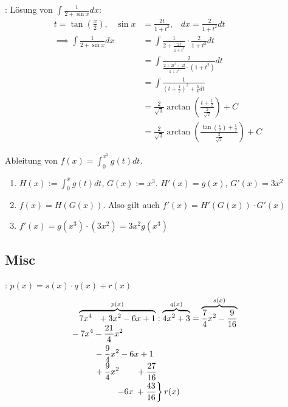\Bsp {}: Lösung von $\displaystyle \int \frac{1}{2 + \sin x} dx$:
\begin{align*}
    t = \tan(\frac{x}{2}), \hspace{10pt} \sin x &= \frac{2t}{1 + t^2}, \hspace{10pt} dx = \frac{2}{1 + t^2} dt \\[-0.1em]
    \implies \int \frac{1}{2 + \sin x} dx &= \int \frac{1}{2 + \frac{2t}{1 + t^2}} \cdot \frac{2}{1 + t^2} dt \\[-0.1em]
        &= \int \frac{2}{\frac{2 + 2t^2 + 2t}{1+t^2} \cdot (1+t^2)} dt \\[-0.1em]
        &= \int \frac{1}{(t + \frac{1}{2})^2 + \frac{3}{4} dt} \\[-0.4em]
        &= \frac{2}{\sqrt{3}} \arctan(\frac{t + \frac{1}{2}}{\frac{2}{\sqrt{2}}}) + C \\[-0.4em]
        &= \frac{2}{\sqrt{3}} \arctan(\frac{\tan(\frac{x}{2}) + \frac{1}{2}}{\frac{2}{\sqrt{2}}}) + C
\end{align*}

\Bsp Ableitung von $f(x) = \displaystyle \int_0^{x^3} g(t) dt$.
\begin{enumerate}
    \item $H(x) := \displaystyle \int_0^x g(t) dt$, $G(x) := x^3$. $H'(x) = g(x)$, $G'(x) = 3x^2$
    \item $f(x) = H(G(x))$. Also gilt auch $f'(x) = H'(G(x)) \cdot G'(x)$
    \item $f'(x) = g(x^3) \cdot (3x^2) = 3x^2 g(x^3)$
\end{enumerate}

\subsection{Misc}

\Bsp {}: $p(x) = s(x) \cdot q(x) + r(x)$
\begin{align*}
    &\overbrace{7x^4 \hspace{7pt} + 3x^2 - 6x + 1}^{p(x)} : \overbrace{4x^2 + 3}^{q(x)} = \overbrace{\frac{7}{4}x^2 - \frac{9}{16}}^{s(x)} \\[-0.6em]
    &\hspace{-9pt}-7x^4 - \frac{21}{4}x^2 \\
    &\hspace{19pt} -\frac{9}{4}x^2 - 6x + 1 \\[-0.3em]
    &\hspace{19pt} +\frac{9}{4}x^2 \hspace{19.5pt} + \frac{27}{16} \\[-0.2em]
    &\hspace{44pt} \left. -6x \hspace{2.5pt} + \frac{43}{16} \right\} r(x)
\end{align*}

